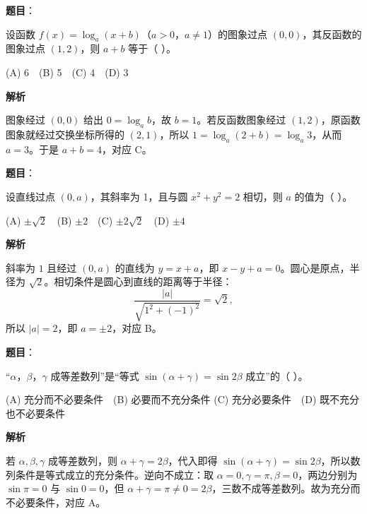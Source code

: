 \begin{answer}

\textbf{题目}：

设函数 \(f(x)=\log_a(x+b)\)（$a>0\text{，}a\ne1$）的图象过点 \((0,0)\)，其反函数的图象过点 \((1,2)\)，则 \(a+b\) 等于（ ）。

(A) 6　(B) 5　(C) 4　(D) 3

\textbf{解析}

图象经过 $(0,0)$ 给出 $0=\log_a b$，故 $b=1$。若反函数图象经过 $(1,2)$，原函数图象就经过交换坐标所得的 $(2,1)$，所以 $1=\log_a(2+b)=\log_a3$，从而 $a=3$。于是 $a+b=4$，对应 C。


\end{answer}
\begin{answer}

\textbf{题目}：

设直线过点 \((0,a)\)，其斜率为 1，且与圆 \(x^2+y^2=2\) 相切，则 \(a\) 的值为（ ）。

(A) \(\pm\sqrt2\)　(B) \(\pm2\)　(C) \(\pm2\sqrt2\)　(D) \(\pm4\)

\textbf{解析}

斜率为 $1$ 且经过 $(0,a)$ 的直线为 $y=x+a$，即 $x-y+a=0$。圆心是原点，半径为 $\sqrt2$。相切条件是圆心到直线的距离等于半径：
\nopagebreak[4]
\[
\frac{|a|}{\sqrt{1^2+(-1)^2}}=\sqrt2,
\]
所以 $|a|=2$，即 $a=\pm2$，对应 B。


\end{answer}
\begin{answer}

\textbf{题目}：

“$\alpha\text{，}\beta\text{，}\gamma$ 成等差数列”是“等式 \(\sin(\alpha+\gamma)=\sin2\beta\) 成立”的（ ）。

(A) 充分而不必要条件　(B) 必要而不充分条件
(C) 充分必要条件　(D) 既不充分也不必要条件

\textbf{解析}

若 $\alpha,\beta,\gamma$ 成等差数列，则 $\alpha+\gamma=2\beta$，代入即得 $\sin(\alpha+\gamma)=\sin2\beta$，所以数列条件是等式成立的充分条件。逆向不成立：取 $\alpha=0,\gamma=\pi,\beta=0$，两边分别为 $\sin\pi=0$ 与 $\sin0=0$，但 $\alpha+\gamma=\pi\ne0=2\beta$，三数不成等差数列。故为充分而不必要条件，对应 A。


\end{answer}
